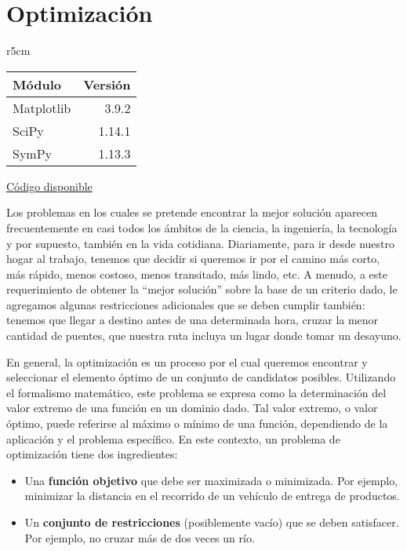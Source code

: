 

\chapter{Optimización} \label{ch:optimizacion}   

\begin{wraptable}{r}{5cm}
\begin{modulesinfo}
\begin{center}
{\small
    \begin{tabular}{l r}
        \toprule
        \textbf{Módulo} & \textbf{Versión} \\
        \midrule
        Matplotlib & 3.9.2 \\
        SciPy & 1.14.1 \\
        SymPy & 1.13.3 \\
        \bottomrule
    \end{tabular}
    \vspace{0.75em}
    
    \href{https://github.com/facundobatista/libro-pyciencia/tree/master/código/optimizacion/}{Código disponible}
}
\end{center}
\end{modulesinfo}
\end{wraptable}

Los problemas en los cuales se pretende encontrar la mejor solución aparecen frecuentemente en casi todos los ámbitos de la ciencia, la ingeniería, la tecnología y por supuesto, también en la vida cotidiana. Diariamente, para ir desde nuestro hogar al trabajo, tenemos que decidir si queremos ir por el camino más corto, más rápido, menos costoso, menos transitado, más lindo, etc. A menudo, a este requerimiento de obtener la ``mejor solución'' sobre la base de un criterio dado, le agregamos algunas restricciones adicionales que se deben cumplir también: tenemos que llegar a destino antes de una determinada hora, cruzar la menor cantidad de puentes, que nuestra ruta incluya un lugar donde tomar un desayuno. 

En general, la optimización es un proceso por el cual queremos encontrar y seleccionar el elemento óptimo de un conjunto de candidatos posibles. Utilizando el formalismo matemático, este problema se expresa como la determinación del valor extremo de una función en un dominio dado. Tal valor extremo, o valor óptimo, puede referirse al máximo o mínimo de una función, dependiendo de la aplicación y el problema específico. En este contexto, un problema de optimización tiene dos ingredientes:
\begin{itemize}
 \item Una \textbf{función objetivo} que debe ser maximizada o minimizada. Por ejemplo, minimizar la distancia en el recorrido de un vehículo de entrega de productos.
 \item Un \textbf{conjunto de restricciones} (posiblemente vacío) que se deben satisfacer. Por ejemplo, no cruzar más de dos veces un río.
\end{itemize}


